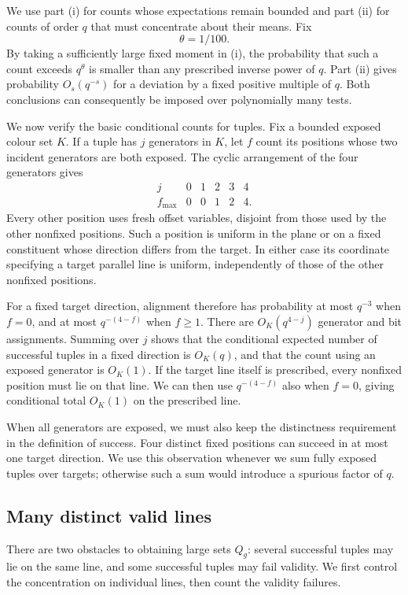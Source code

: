 We use part (i) for counts whose expectations remain bounded and part
(ii) for counts of order $q$ that must concentrate about their means.
Fix
\[
 \theta=1/100.
\]
By taking a sufficiently large fixed moment in (i), the probability that
such a count exceeds $q^\theta$ is smaller than any prescribed inverse
power of $q$. Part (ii) gives probability $O_s(q^{-s})$ for a deviation
by a fixed positive multiple of $q$. Both conclusions can consequently
be imposed over polynomially many tests.

We now verify the basic conditional counts for tuples. Fix a bounded
exposed colour set $K$. If a tuple has $j$ generators in $K$, let $f$
count its positions whose two incident generators are both exposed.
The cyclic arrangement of the four generators gives
\[
\begin{array}{c|ccccc}
j&0&1&2&3&4\\ \hline
f_{\max}&0&0&1&2&4.
\end{array}
\]
Every other position uses fresh offset variables, disjoint from those
used by the other nonfixed positions. Such a position is uniform in the
plane or on a fixed constituent whose direction differs from the target.
In either case its coordinate specifying a target parallel line is
uniform, independently of those of the other nonfixed positions.

For a fixed target direction, alignment therefore has probability at
most $q^{-3}$ when $f=0$, and at most $q^{-(4-f)}$ when $f\ge1$.
There are $O_K(q^{4-j})$ generator and bit assignments. Summing over
$j$ shows that the conditional expected number of successful tuples in
a fixed direction is $O_K(q)$, and that the count using an exposed
generator is $O_K(1)$. If the target line itself is prescribed, every
nonfixed position must lie on that line. We can then use
$q^{-(4-f)}$ also when $f=0$, giving conditional total $O_K(1)$ on
the prescribed line.

When all generators are exposed, we must also keep the distinctness
requirement in the definition of success. Four distinct fixed positions
can succeed in at most one target direction. We use this observation
whenever we sum fully exposed tuples over targets; otherwise such a sum
would introduce a spurious factor of $q$.

\subsection{Many distinct valid lines}

There are two obstacles to obtaining large sets $Q_g$: several successful
tuples may lie on the same line, and some successful tuples may fail
validity. We first control the concentration on individual lines, then
count the validity failures.

